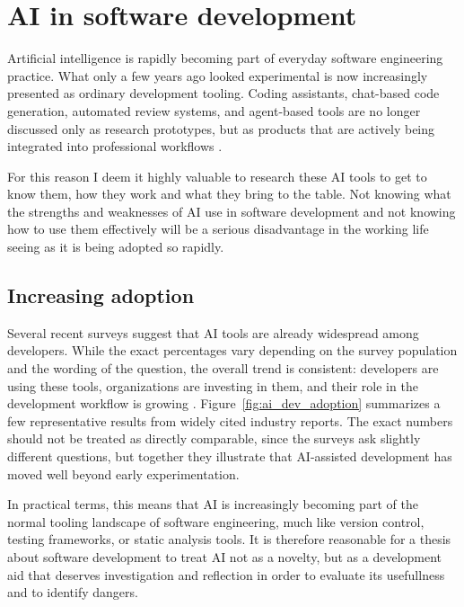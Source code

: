 \section{\ac{AI} in software development}
  Artificial intelligence is rapidly becoming part of everyday software engineering practice. What only a few years ago looked experimental is now increasingly presented as ordinary development tooling. Coding assistants, chat-based code generation, automated review systems, and agent-based tools are no longer discussed only as research prototypes, but as products that are actively being integrated into professional workflows \cite{AI2024Stack,staffSurveyAIWave2024,DORAAccelerateState}.

  For this reason I deem it highly valuable to research these \ac{AI} tools to get to know them, how they work and what they bring to the table. Not knowing what the strengths and weaknesses of \ac{AI} use in software development and not knowing how to use them effectively will be a serious disadvantage in the working life seeing as it is being adopted so rapidly.

  \subsection{Increasing adoption}
  Several recent surveys suggest that \ac{AI} tools are already widespread among developers. While the exact percentages vary depending on the survey population and the wording of the question, the overall trend is consistent: developers are using these tools, organizations are investing in them, and their role in the development workflow is growing \cite{AI2024Stack,staffSurveyAIWave2024,DORAAccelerateState}. Figure~\ref{fig:ai_dev_adoption} summarizes a few representative results from widely cited industry reports. The exact numbers should not be treated as directly comparable, since the surveys ask slightly different questions, but together they illustrate that \ac{AI}-assisted development has moved well beyond early experimentation.

  \vspace{10 mm}
  
  \vspace{10 mm}

  In practical terms, this means that \ac{AI} is increasingly becoming part of the normal tooling landscape of software engineering, much like version control, testing frameworks, or static analysis tools. It is therefore reasonable for a thesis about software development to treat \ac{AI} not as a novelty, but as a development aid that deserves investigation and reflection in order to evaluate its usefullness and to identify dangers.


